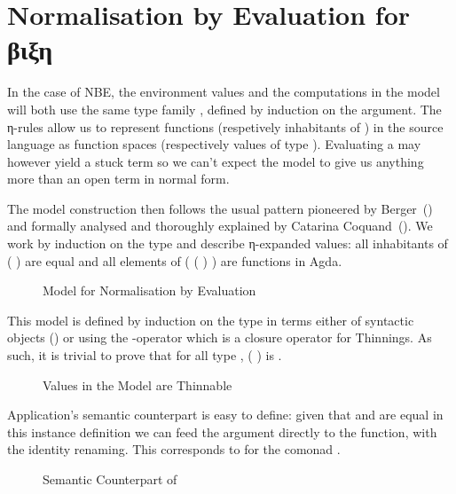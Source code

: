 \section{Normalisation by Evaluation for βιξη}
\label{normbye}

In the case of NBE, the environment values and the computations in the model
will both use the same type family , defined by induction on the
 argument. The η-rules allow us to represent functions (respetively
inhabitants of ) in the source language as function spaces
(respectively values of type ). Evaluating a  may however
yield a stuck term so we can't expect the model to give us anything more than
an open term in normal form.

The model construction then follows the usual pattern pioneered by
Berger~(\citeyear{berger1993program}) and formally analysed and thoroughly
explained by Catarina Coquand~(\citeyear{coquand2002formalised}). We work
by induction on the type and describe η-expanded values: all inhabitants
of (  ) are equal and all elements
of ( (  ) ) are functions in Agda.

\begin{figure}[h]
\caption{Model for Normalisation by Evaluation\label{fig:nbemodel}}
\end{figure}

This model is defined by induction on the type in terms either of
syntactic objects () or using the -operator which is
a closure operator for Thinnings. As such, it is trivial to prove
that for all type , ( ) is .

\begin{figure}[h]
\caption{Values in the Model are Thinnable\label{fig:thnbemodel}}
\end{figure}

Application's semantic counterpart is easy to define: given that 
and  are equal in this instance definition we can feed the argument
directly to the function, with the identity renaming. This corresponds to
 for the comonad .

\begin{figure}[h]
\caption{Semantic Counterpart of \label{fig:nbeapp}}
\end{figure}

